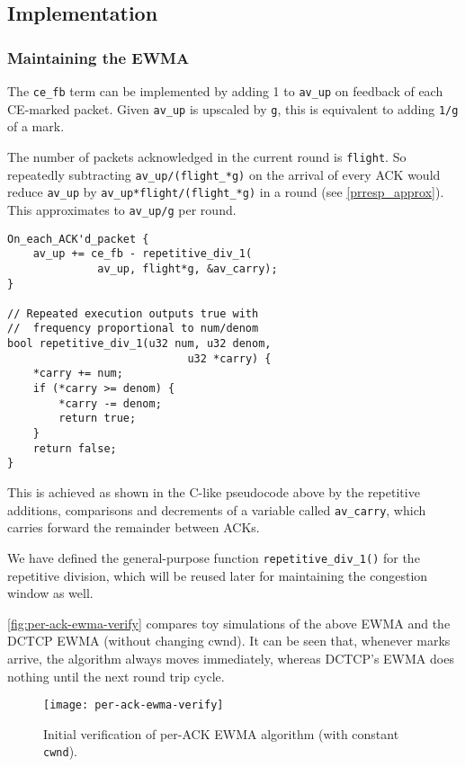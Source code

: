 \subsection{Implementation}\label{prresp_implementation}

\subsubsection{Maintaining the EWMA}

The \texttt{ce\_fb} term can be implemented by adding 1 to \texttt{av\_up} on feedback of each CE-marked packet. Given \texttt{av\_up} is upscaled by \texttt{g}, this is equivalent to adding \texttt{1/g} of a mark.

The number of packets acknowledged in the current round is \texttt{flight}. So repeatedly subtracting \texttt{av\_up/(flight\_*g)} on the arrival of every ACK would reduce \texttt{av\_up} by \texttt{av\_up*flight/(flight\_*g)} in a round (see \autoref{prresp_approx}). This approximates to \texttt{av\_up/g} per round.

\begin{verbatim}
On_each_ACK'd_packet {
    av_up += ce_fb - repetitive_div_1(
              av_up, flight*g, &av_carry);
}

// Repeated execution outputs true with 
//  frequency proportional to num/denom
bool repetitive_div_1(u32 num, u32 denom,
                            u32 *carry) {
    *carry += num;
    if (*carry >= denom) {
        *carry -= denom;
        return true;
    }
    return false;
}
\end{verbatim}

This is achieved as shown %
in the C-like pseudocode above by the repetitive additions, comparisons and decrements of a variable called \texttt{av\_carry}, which carries forward the remainder between ACKs. 

We have defined the general-purpose function \texttt{repetitive\_div\_1()} for the repetitive division, which will be reused later for maintaining the congestion window as well.

\autoref{fig:per-ack-ewma-verify} compares toy simulations of the above EWMA and the DCTCP EWMA (without changing cwnd). It can be seen that, whenever marks arrive, the algorithm always moves immediately, whereas DCTCP's EWMA does nothing until the next round trip cycle.
\begin{figure}[h]
	\texttt{[image: per-ack-ewma-verify]}
	\caption{Initial verification of per-ACK EWMA algorithm (with constant \texttt{cwnd}).}\label{fig:per-ack-ewma-verify}
\end{figure}

